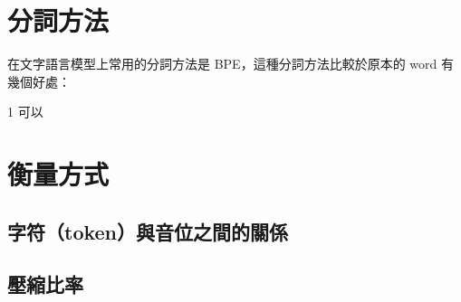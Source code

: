 
\section{分詞方法}

在文字語言模型上常用的分詞方法是 BPE，這種分詞方法比較於原本的 word 有幾個好處：

1 可以



\section{衡量方式}

\subsection{字符（token）與音位之間的關係}

\subsection{壓縮比率}
